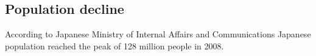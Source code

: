 \documentclass[10pt, conference, compsocconf]{IEEEtran}
\begin{document}
\subsection{Population decline}
According to Japanese Ministry of Internal Affairs and Communications Japanese population reached the peak of 128 million people in 2008.
%

%
\end{document}
